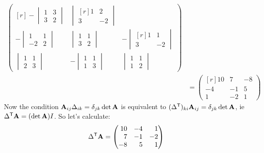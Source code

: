 \documentclass[fleqn,a4paper,11pt]{article}
\begin{document}
\begin{enumerate}[label=\textbf{\arabic*.}]
\begin{align*}
\begin{pmatrix*}[r]
     -\begin{vmatrix}
      1 & 3 \\
      3 & 2
     \end{vmatrix} &
     \begin{vmatrix*}[r]
      1 & 2 \\
      3 & -2
     \end{vmatrix*} \\[3ex]
     -\begin{vmatrix}
      1 & 1 \\
      -2 & 2
     \end{vmatrix} &
     \begin{vmatrix}
      1 & 1 \\
      3 & 2
     \end{vmatrix} &
     -\begin{vmatrix*}[r]
      1 & 1 \\
      3 & -2
     \end{vmatrix*} \\[3ex]
     \begin{vmatrix}
      1 & 1 \\
      2 & 3
     \end{vmatrix} &
     -\begin{vmatrix}
      1 & 1 \\
      1 & 3
     \end{vmatrix} &
     \begin{vmatrix}
      1 & 1 \\
      1 & 2
     \end{vmatrix}
    \end{pmatrix*} \\
    &= \begin{pmatrix*}[r]
     10 & 7 & -8 \\
     -4 & -1 & 5 \\
     1 & -2 & 1
    \end{pmatrix*}
   \end{align*}
   Now the condition \(\mathbf{A}_{ij} \Delta_{ik} = \delta_{jk} \det \mathbf{A}\) is
   equivalent to \((\Delta^{\mathsf T})_{ki} \mathbf{A}_{ij} = \delta_{jk} \det \mathbf{A}\),
   ie \(\Delta^{\mathsf T} \mathbf{A} = (\det \mathbf{A})I\). So let's calculate:
   \begin{equation*}
    \tran \Delta \mat A =
    \begin{pmatrix*}[r]
     10 & -4 & 1 \\
     7 & -1 & -2 \\
     -8 & 5 & 1
    \end{pmatrix*}

\end{equation*}
\end{enumerate}
\end{document}
